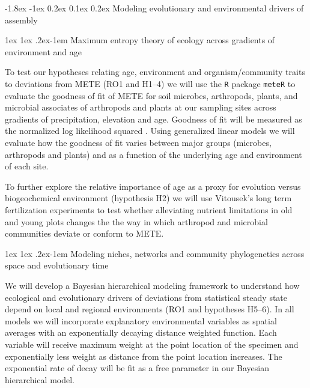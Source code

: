 \documentclass[11pt]{article}
\makeatletter
\renewcommand\subsubsection{\@startsection{subsection}{1}{\z@}%
                                  {-1.8ex \@plus -1ex \@minus 0.2ex}%
                                  {0.1ex \@plus 0.2ex}%
                                  {\normalfont\bfseries}}
\renewcommand{\paragraph}{\@startsection{paragraph}{4}{\z@}
  {1ex \@plus 1ex \@minus .2ex}{-1em}
  {\normalfont\normalsize\it}
}
\makeatother
\begin{document}
\subsubsection{Modeling evolutionary and environmental drivers of
  assembly}


\paragraph{Maximum entropy theory of ecology across gradients of
  environment and age}

To test our hypotheses relating age, environment and
organism/community traits to deviations from METE (RO1 and H1--4) we
will use the {\tt R} package {\tt meteR} \citep[developed by
Rominger][]{rominger2016} to evaluate the goodness of fit of METE for
soil microbes, arthropods, plants, and microbial associates of
arthropods and plants at our sampling sites across gradients of
precipitation, elevation and age.  Goodness of fit will be measured as
the normalized log likelihood squared \citep[described
in][]{rominger2016}. Using generalized linear models we will evaluate
how the goodness of fit varies between major groups (microbes,
arthropods and plants) and as a function of the underlying age and
environment of each site.

To further explore the relative importance of age as a proxy for
evolution versus biogeochemical environment (hypothesis H2) we will
use Vitousek's long term fertilization experiments \citep[see letter
of collaboration;][]{vitousek1997nutrient} to test whether alleviating
nutrient limitations in old and young plots changes the the way in
which arthropod and microbial communities deviate or conform to METE.


\paragraph{Modeling niches, networks and community phylogenetics
  across space and evolutionary time}

We will develop a Bayesian hierarchical modeling framework to
understand how ecological and evolutionary drivers of deviations from
statistical steady state depend on local and regional environments
(RO1 and hypotheses H5--6).  In all models we will incorporate
explanatory environmental variables as spatial averages with an
exponentially decaying distance weighted function.  Each variable will
receive maximum weight at the point location of the specimen and
exponentially less weight as distance from the point location
increases.  The exponential rate of decay will be fit as a free
parameter in our Bayesian hierarchical model.
\end{document}
